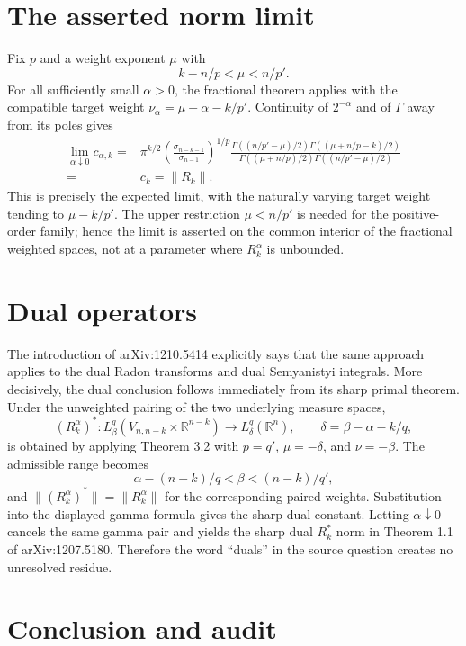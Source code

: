 \documentclass[11pt]{article}
\newcommand{\R}{\mathbb R}
\newcommand{\norm}[1]{\lVert#1\rVert}
\newcommand{\sig}{\sigma}
\begin{document}
\section{The asserted norm limit}

Fix $p$ and a weight exponent $\mu$ with
\[
 k-n/p<\mu<n/p'.
\]
For all sufficiently small $\alpha>0$, the fractional theorem applies with
the compatible target weight $\nu_\alpha=\mu-\alpha-k/p'$.  Continuity of
$2^{-\alpha}$ and of $\Gamma$ away from its poles gives
\begin{align*}
\lim_{\alpha\downarrow0}c_{\alpha,k}
={}&\pi^{k/2}\left(\frac{\sig_{n-k-1}}{\sig_{n-1}}\right)^{1/p}
\frac{\Gamma((n/p'-\mu)/2)
      \Gamma((\mu+n/p-k)/2)}
     {\Gamma((\mu+n/p)/2)
      \Gamma((n/p'-\mu)/2)}\\
={}&c_k=\norm{R_k}.
\end{align*}
This is precisely the expected limit, with the naturally varying target
weight tending to $\mu-k/p'$.  The upper restriction $\mu<n/p'$ is needed
for the positive-order family; hence the limit is asserted on the common
interior of the fractional weighted spaces, not at a parameter where
$R_k^\alpha$ is unbounded.

\section{Dual operators}

The introduction of arXiv:1210.5414 explicitly says that the same approach
applies to the dual Radon transforms and dual Semyanistyi integrals.  More
decisively, the dual conclusion follows immediately from its sharp primal
theorem.  Under the unweighted pairing of the two underlying measure spaces,
\[
 (R_k^\alpha)^*:
 L^q_\beta(V_{n,n-k}\times\R^{n-k})
 \longrightarrow L^q_\delta(\R^n),
 \qquad \delta=\beta-\alpha-k/q,
\]
is obtained by applying Theorem 3.2 with $p=q'$, $\mu=-\delta$, and
$\nu=-\beta$.  The admissible range becomes
\[
 \alpha-(n-k)/q<\beta<(n-k)/q',
\]
and $\norm{(R_k^\alpha)^*}=\norm{R_k^\alpha}$ for the corresponding paired
weights.  Substitution into the displayed gamma formula gives the sharp dual
constant.  Letting $\alpha\downarrow0$ cancels the same gamma pair and yields
the sharp dual $R_k^*$ norm in Theorem 1.1 of arXiv:1207.5180.  Therefore the
word ``duals'' in the source question creates no unresolved residue.

\section{Conclusion and audit}
\end{document}
